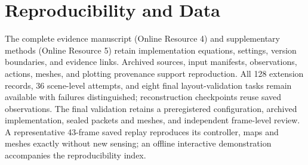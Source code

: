 \documentclass[pdflatex,sn-mathphys-num]{sn-jnl}
\begin{document}
\hypertarget{reproducibility-and-data}{%
\section{Reproducibility and Data}\label{reproducibility-and-data}}

The complete evidence manuscript (Online Resource 4) and supplementary methods (Online Resource 5) retain implementation equations, settings, version boundaries, and evidence links. Archived sources, input manifests, observations, actions, meshes, and plotting provenance support reproduction. All 128 extension records, 36 scene-level attempts, and eight final layout-validation tasks remain available with failures distinguished; reconstruction checkpoints reuse saved observations. The final validation retains a preregistered configuration, archived implementation, sealed packets and meshes, and independent frame-level review. A representative 43-frame saved replay reproduces its controller, maps and meshes exactly without new sensing; an offline interactive demonstration accompanies the reproducibility index.
\end{document}
